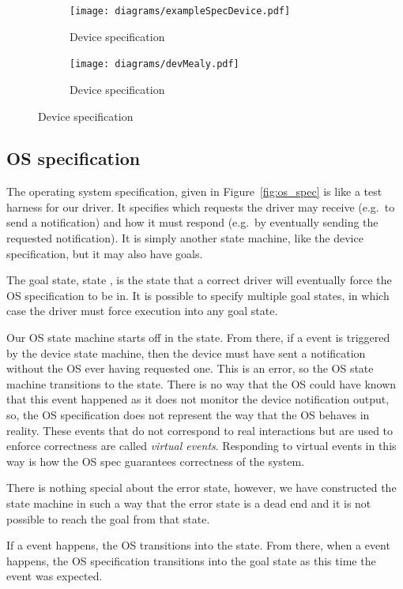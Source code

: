 \begin{figure}
\centering
\begin{subfigure}[t]{0.47\textwidth}
\texttt{[image: diagrams/exampleSpecDevice.pdf]}
\caption{Device specification}
\label{fig:dev_spec}
\end{subfigure}
\hfill
\begin{subfigure}[t]{0.47\textwidth}
\texttt{[image: diagrams/devMealy.pdf]}
\caption{Device specification}
\label{fig:dev_spec_mealy}
\end{subfigure}
\end{figure}

\subsection{OS specification}

The operating system specification, given in Figure~\ref{fig:os_spec} is like a test harness for our driver. It specifies which requests the driver may receive (e.g.\ to send a notification) and how it must respond (e.g.\ by eventually sending the requested notification). It is simply another state machine, like the device specification, but it may also have goals.

The goal state, state , is the state that a correct driver will eventually force the OS specification to be in. It is possible to specify multiple goal states, in which case the driver must force execution into any goal state.

Our OS state machine starts off in the  state. From there, if a  event is triggered by the device state machine, then the device must have sent a notification without the OS ever having requested one. This is an error, so the OS state machine transitions to the  state. There is no way that the OS could have known that this event happened as it does not monitor the device notification output, so, the OS specification does not represent the way that the OS behaves in reality. These events that do not correspond to real interactions but are used to enforce correctness are called \emph{virtual events}. Responding to virtual events in this way is how the OS spec guarantees correctness of the system. 

There is nothing special about the error state, however, we have constructed the state machine in such a way that the error state is a dead end and it is not possible to reach the goal from that state.

If a  event happens, the OS transitions into the  state. From there, when a  event happens, the OS specification transitions into the goal state as this time the  event was expected. 

